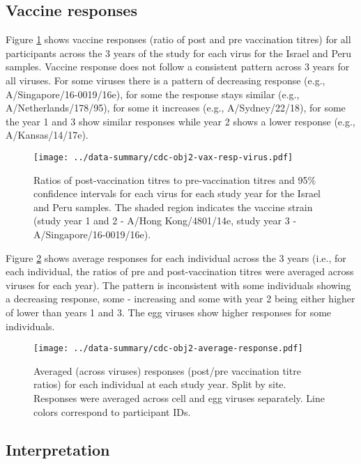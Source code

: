 \documentclass[12pt]{article}
\begin{document}
\subsection{Vaccine responses}

Figure \ref{fig:cdc-obj2-vax-resp-virus} shows vaccine responses (ratio of post and pre vaccination titres)
for all participants across the 3 years of the study for each virus for the Israel and Peru samples. Vaccine
response does not follow a consistent pattern across 3 years for all viruses. For some viruses
there is a pattern of decreasing response (e.g., A/Singapore/16-0019/16e), for some the response stays similar (e.g., A/Netherlands/178/95), for some it increases
(e.g., A/Sydney/22/18), for some the year 1 and 3 show similar responses while
year 2 shows a lower response (e.g., A/Kansas/14/17e).

\begin{figure}
	\texttt{[image: ../data-summary/cdc-obj2-vax-resp-virus.pdf]}
	\caption{Ratios of post-vaccination titres to pre-vaccination titres and 95\% confidence intervals for each virus for each study year for the Israel and Peru samples. The shaded region indicates the vaccine strain (study year 1 and 2 - A/Hong Kong/4801/14e, study year 3 - A/Singapore/16-0019/16e).}
	\label{fig:cdc-obj2-vax-resp-virus}
\end{figure}

Figure \ref{fig:cdc-obj2-average-response} shows average responses for each individual across the 3 years (i.e., for each individual, the ratios of pre and post-vaccination titres were averaged across viruses for each year).
The pattern is inconsistent with some individuals showing a decreasing response,
some - increasing and some with year 2 being either higher of lower
than years 1 and 3.
The egg viruses show higher responses for some individuals.

\begin{figure}
	\texttt{[image: ../data-summary/cdc-obj2-average-response.pdf]}
	\caption{Averaged (across viruses) responses (post/pre vaccination titre ratios) for each individual at each study year. Split by site. Responses were averaged across cell and egg viruses separately. Line colors correspond to participant IDs.}
	\label{fig:cdc-obj2-average-response}
\end{figure}

\subsection{Interpretation}
\end{document}
